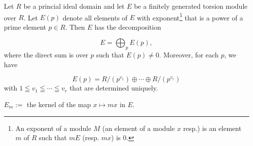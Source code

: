     \begin{theorem}
        Let $R$ be a princial ideal domain and let $E$ be a finitely generated torsion 
        module over $R$. Let $E(p)$ denote all elements of $E$ with exponent\footnote{An exponent of a module $M$ (an element of a module $x$ resp.) is an element $m$ of $R$ such that $mE$ (resp. $mx$) is 0.} that is a power of a prime element $p \in R$. Then $E$ has the decomposition

        $$E = \bigoplus_p E(p), $$
        where the direct sum is over $p$ such that $E(p) \neq 0.$ Moreover, for each $p$, we have
        
        $$E(p) = R/(p^{v_1}) \oplus \cdots \oplus R/(p^{v_r})$$
        with $1 \leqq v_1  \leqq \cdots \leqq v_r$ that are determined uniquely.
    \end{theorem}
    \noindent $E_m := $ the kernel of the map $x \mapsto mx$ in $E$.
